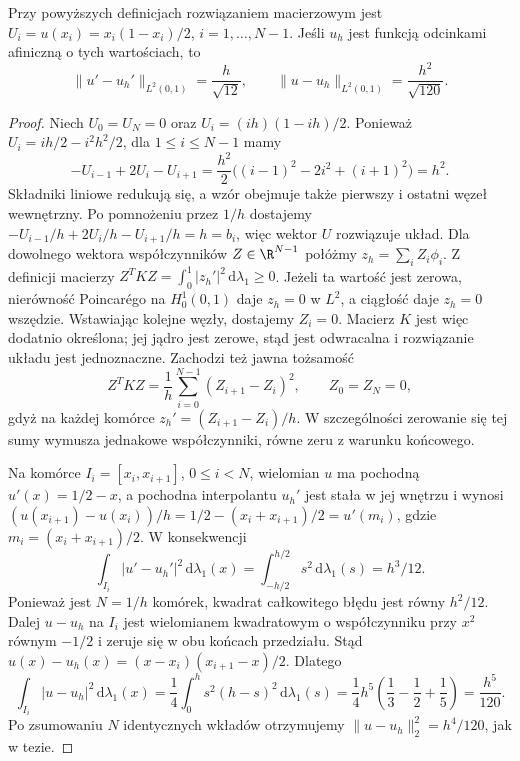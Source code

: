 \begin{stwierdzenie}
\label{prop:pde11-fem-errors}
Przy powyższych definicjach rozwiązaniem macierzowym jest
$U_i=u(x_i)=x_i(1-x_i)/2$, $i=1,\ldots,N-1$.
Jeśli $u_h$ jest funkcją odcinkami afiniczną o tych wartościach,
to
\[
\|u'-u_h'\|_{L^2(0,1)}=\frac h{\sqrt{12}},
\qquad
\|u-u_h\|_{L^2(0,1)}=\frac{h^2}{\sqrt{120}}.
\]
\end{stwierdzenie}
\begin{proof}
Niech $U_0=U_N=0$ oraz
$U_i=(ih)(1-ih)/2$. Ponieważ $U_i=ih/2-i^2h^2/2$, dla
$1\le i\le N-1$ mamy
\[
 -U_{i-1}+2U_i-U_{i+1}
 =\frac{h^2}{2}\bigl((i-1)^2-2i^2+(i+1)^2\bigr)=h^2.
\]
Składniki liniowe redukują się, a wzór obejmuje także
pierwszy i ostatni węzeł wewnętrzny.
Po pomnożeniu przez $1/h$ dostajemy
$-U_{i-1}/h+2U_i/h-U_{i+1}/h=h=b_i$,
więc wektor $U$ rozwiązuje układ. Dla dowolnego
wektora współczynników $Z\in\R^{N-1}$ połóżmy
$z_h=\sum_i Z_i\phi_i$. Z definicji macierzy
$Z^TKZ=\int_0^1|z_h'|^2\,\mathrm d\lambda_1\ge0$.
Jeżeli ta wartość jest zerowa, nierówność Poincarégo
na $H_0^1(0,1)$ daje $z_h=0$ w $L^2$,
a ciągłość daje $z_h=0$ wszędzie.
Wstawiając kolejne węzły, dostajemy $Z_i=0$.
Macierz $K$ jest więc dodatnio określona; jej jądro
jest zerowe, stąd jest odwracalna i rozwiązanie
układu jest jednoznaczne.
Zachodzi też jawna tożsamość
\[
 Z^TKZ=\frac1h\sum_{i=0}^{N-1}(Z_{i+1}-Z_i)^2,
 \qquad Z_0=Z_N=0,
\]
gdyż na każdej komórce $z_h'=(Z_{i+1}-Z_i)/h$.
W szczególności zerowanie się tej sumy wymusza
jednakowe współczynniki, równe zeru z warunku końcowego.

Na komórce $I_i=[x_i,x_{i+1}]$, $0\le i<N$,
wielomian $u$
ma pochodną $u'(x)=1/2-x$, a pochodna interpolantu
$u_h'$ jest stała w jej wnętrzu i wynosi
$(u(x_{i+1})-u(x_i))/h=1/2-(x_i+x_{i+1})/2
=u'(m_i)$, gdzie $m_i=(x_i+x_{i+1})/2$.
W konsekwencji
\[
\int_{I_i}|u'-u_h'|^2\,\mathrm d\lambda_1(x)
=\int_{-h/2}^{h/2}s^2\,\mathrm d\lambda_1(s)=h^3/12.
\]
Ponieważ jest $N=1/h$ komórek, kwadrat całkowitego błędu
jest równy $h^2/12$.
Dalej $u-u_h$ na $I_i$ jest wielomianem kwadratowym
o współczynniku przy $x^2$ równym $-1/2$
i zeruje się w obu końcach przedziału. Stąd
$u(x)-u_h(x)=(x-x_i)(x_{i+1}-x)/2$.
Dlatego
\[
\int_{I_i}|u-u_h|^2\,\mathrm d\lambda_1(x)
=\frac14\int_0^h s^2(h-s)^2\,\mathrm d\lambda_1(s)
=\frac14 h^5\left(\frac13-\frac12+\frac15\right)
=\frac{h^5}{120}.
\]
Po zsumowaniu $N$ identycznych wkładów otrzymujemy
$\|u-u_h\|_2^2=h^4/120$, jak w tezie.
\end{proof}

